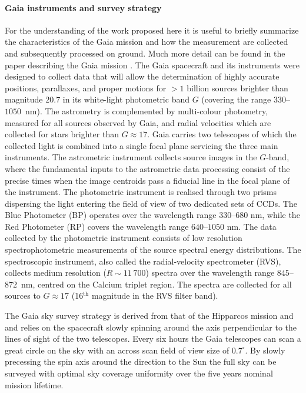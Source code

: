 \paragraph{Gaia instruments and survey strategy} For the understanding of the work proposed here it is useful to briefly summarize the characteristics of the Gaia mission and how the measurement are collected and subsequently processed on ground. Much more detail can be found in the paper describing the Gaia mission \cite{2016A&A...595A...1G}. The Gaia spacecraft and its instruments were designed to collect data that will allow the determination of highly accurate positions, parallaxes, and proper motions for $>1$ billion sources brighter than magnitude $20.7$ in its white-light photometric band $G$ (covering the range $330$--$1050$~nm). The astrometry is complemented by multi-colour photometry, measured for all sources observed by Gaia, and radial velocities which are collected for stars brighter than $G\approx17$. Gaia carries two telescopes of which the collected light is combined into a single focal plane servicing the three main instruments. The astrometric instrument collects source images in the $G$-band, where the fundamental inputs to the astrometric data processing consist of the precise times when the image centroids pass a fiducial line in the focal plane of the instrument. The photometric instrument is realised through two prisms dispersing the light entering the field of view of two dedicated sets of CCDs. The Blue Photometer (BP) operates over the wavelength range $330$--$680$ nm, while the Red Photometer (RP) covers the wavelength range $640$--$1050$ nm. The data collected by the photometric instrument consists of low resolution spectrophotometric measurements of the source spectral energy distributions. The spectroscopic instrument, also called the radial-velocity spectrometer (RVS), collects medium resolution ($R\sim11\,700$) spectra over the wavelength range $845$--$872$~nm, centred on the Calcium triplet region. The spectra are collected for all sources to $G\approx17$ (16$^\text{th}$ magnitude in the RVS filter band).

The Gaia sky survey strategy is derived from that of the Hipparcos mission and and relies on the spacecraft slowly spinning around the axis perpendicular to the lines of sight of the two telescopes. Every six hours the Gaia telescopes can scan a great circle on the sky with an across scan field of view size of $0.7^\circ$. By slowly precessing the spin axis around the direction to the Sun the full sky can be surveyed with optimal sky coverage uniformity over the five years nominal mission lifetime. 

